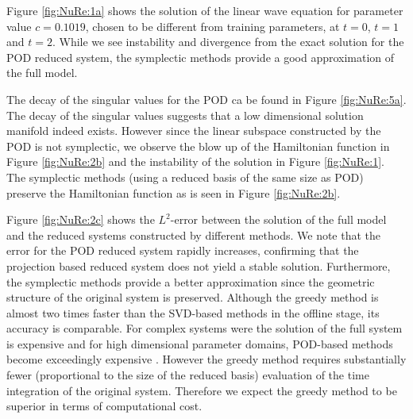 Figure \ref{fig:NuRe:1a} shows the solution of the linear wave equation for parameter value $c=0.1019$, chosen to be different from training parameters, at $t=0$, $t = 1$ and $t=2$. While we see instability and divergence from the exact solution for the POD reduced system, the symplectic methods provide a good approximation of the full model. 

{\edit The decay of the singular values for the POD ca be found in Figure \ref{fig:NuRe:5a}. The decay} of the singular values suggests that a low dimensional solution manifold indeed exists. However since the linear subspace constructed by the POD is not symplectic, we observe the blow up of the Hamiltonian function in Figure \ref{fig:NuRe:2b} and the instability of the solution in Figure \ref{fig:NuRe:1}. The symplectic methods (using a reduced basis of the same size as POD) preserve the Hamiltonian function as is seen in Figure \ref{fig:NuRe:2b}.

Figure \ref{fig:NuRe:2c} shows the $L^2$-error between the solution of the full model and the reduced systems constructed by different methods. We note that the error for the POD reduced system rapidly increases, confirming that {\edit the} projection based reduced system does not yield a stable solution. Furthermore, the symplectic methods provide a better approximation since the geometric structure of the original system is preserved. Although the greedy method is almost {\edit two times faster than the SVD-based methods} in the offline stage, its accuracy is comparable. {\edit For complex systems were the solution of the full system is expensive and for high dimensional parameter domains, POD-based methods become exceedingly expensive \cite{Anonymous:2016wl,Quarteroni:2016wi}. However the greedy method requires substantially fewer (proportional to the size of the reduced basis) evaluation of the time integration of the original system. Therefore we expect the greedy method to be superior in terms of computational cost.}



